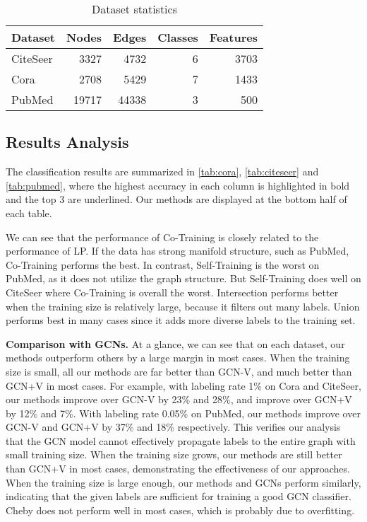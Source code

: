 \documentclass[letterpaper]{article} \usepackage{aaai18}  \usepackage{times}  \usepackage{helvet}  \usepackage{courier}  \usepackage{url}  \usepackage{graphicx}  \usepackage{algorithm}
\begin{document}
\begin{table}
\caption{Dataset statistics}\label{tab:dataset}
\centering
\begin{tabular}{lrrrr}
\textbf{Dataset}    &    \textbf{Nodes}    &    \textbf{Edges}    &    \textbf{Classes}    &    \textbf{Features} \\
\midrule
CiteSeer    &    3327    &    4732    &    6        &    3703    \\
Cora     &    2708    &    5429    &    7        &    1433    \\
PubMed    &    19717    &    44338    &    3        &    500    \\
\end{tabular}
\end{table}








\subsection{Results Analysis}










The classification results are summarized in \tablename\;\ref{tab:cora}, \ref{tab:citeseer} and \ref{tab:pubmed}, where the highest accuracy in each column is highlighted in bold and the top 3 are underlined. Our methods are displayed at the bottom half of each table.

We can see that the performance of Co-Training is closely related to the performance of LP. If the data has strong manifold structure, such as PubMed, Co-Training performs the best. In contrast, Self-Training is the worst on PubMed, as it does not utilize the graph structure. But Self-Training does well on CiteSeer where Co-Training is overall the worst. Intersection performs better when the training size is relatively large, because it filters out many labels. Union performs best in many cases since it adds more diverse labels to the training set.

\textbf{Comparison with GCNs.}
At a glance, we can see that on each dataset, our methods outperform others by a large margin in most cases. When the training size is small, all our methods are far better than GCN-V, and much better than GCN+V in most cases. For example, with labeling rate 1\% on Cora and CiteSeer, our methods improve over GCN-V by 23\% and 28\%, and improve over GCN+V by 12\% and 7\%. With labeling rate 0.05\% on PubMed, our methods improve over GCN-V and GCN+V by 37\% and 18\% respectively. This verifies our analysis that the GCN model cannot effectively propagate labels to the entire graph with small training size. When the training size grows, our methods are still better than GCN+V in most cases, demonstrating the effectiveness of our approaches. When the training size is large enough, our methods and GCNs perform similarly, indicating that the given labels are sufficient for training a good GCN classifier. Cheby does not perform well in most cases, which is probably due to overfitting.
\end{document}
